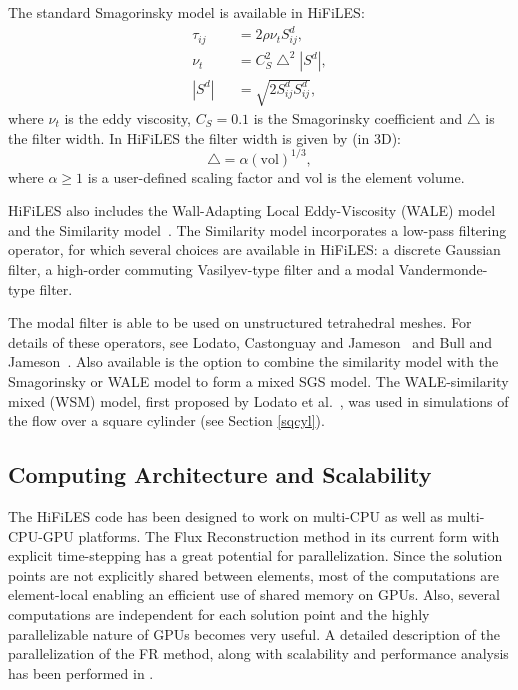 The standard Smagorinsky model\cite{smagorinsky1963} is available in HiFiLES:
\begin{eqnarray}\label{smag}
\tau_{ij} &&= 2 \rho \nu_t S^d_{ij}, \\
\nu_t &&= C_S^2 \bigtriangleup^2 | S^d |,\\
| S^d | &&= \sqrt{2 S^d_{ij} S^d_{ij}},
\end{eqnarray}
where $\nu_t$ is the eddy viscosity, $C_S = 0.1$ is the Smagorinsky coefficient and $\bigtriangleup$ is the filter width. In HiFiLES the filter width is given by (in 3D):
\begin{equation}
\bigtriangleup = \alpha (\text{vol})^{1/3},
\end{equation}
where $\alpha \geq 1$ is a user-defined scaling factor and vol is the element volume.

HiFiLES also includes the Wall-Adapting Local Eddy-Viscosity (WALE) model~\cite{nicoud1999} and the Similarity model~\cite{bardina1980}.
The Similarity model incorporates a low-pass filtering operator, for which several choices are available in HiFiLES: a discrete Gaussian filter\cite{lodato2012b}, a high-order commuting Vasilyev-type filter\cite{vasilyev1998,vasilyev2001} and a modal Vandermonde-type filter\cite{blackburn2003}.

The modal filter is able to be used on unstructured tetrahedral meshes. For details of these operators, see Lodato, Castonguay and Jameson~\cite{lodato2012b} and Bull and Jameson~\cite{bull2013a}. Also available is the option to combine the similarity model with the Smagorinsky or WALE model to form a mixed SGS model. The WALE-similarity mixed (WSM) model, first proposed by Lodato et al.~\cite{lodato2009}, was used in simulations of the flow over a square cylinder (see Section \ref{sqcyl}).

\subsection{Computing Architecture and Scalability}

The HiFiLES code has been designed to work on multi-CPU as well as multi-CPU-GPU platforms. The Flux Reconstruction method in its current form with explicit time-stepping has a great potential for parallelization. Since the solution points are not explicitly shared between elements, most of the computations are element-local enabling an efficient use of shared memory on GPUs. Also, several computations are independent for each solution point and the highly parallelizable nature of GPUs becomes very useful. A detailed description of the parallelization of the FR method, along with scalability and performance analysis has been performed in \cite{castonguay2011}.
